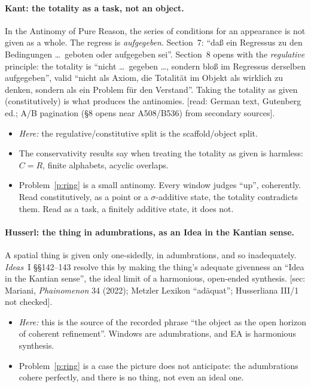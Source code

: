 \documentclass[11pt]{article}
\theoremstyle{definition}
\theoremstyle{remark}
\begin{document}
\paragraph{Kant: the totality as a task, not an object.}
In the Antinomy of Pure Reason, the series of conditions for an appearance is not
given as a whole. The regress is \emph{aufgegeben}. Section~7: ``daß ein
Regressus zu den Bedingungen \dots\ geboten oder aufgegeben sei''. Section~8 opens
with the \emph{regulative} principle: the totality is ``nicht \dots\ gegeben
\dots, sondern bloß im Regressus derselben aufgegeben'', valid ``nicht als Axiom,
die Totalität im Objekt als wirklich zu denken, sondern als ein Problem für den
Verstand''. Taking the totality as given (constitutively) is what produces the
antinomies. \textsf{[read: German text, Gutenberg ed.; A/B pagination (\S8 opens
near A508/B536) from secondary sources]}.
\begin{itemize}[nosep]
  \item \emph{Here:} the regulative/constitutive split is the scaffold/object
    split.
  \item The conservativity results say when treating the totality as given is
    harmless: $C=R$, finite alphabets, acyclic overlaps.
  \item Problem~\ref{p:ring} is a small antinomy. Every window judges ``up'',
    coherently. Read constitutively, as a point or a $\sigma$-additive state, the
    totality contradicts them. Read as a task, a finitely additive state, it does
    not.
\end{itemize}

\paragraph{Husserl: the thing in adumbrations, as an Idea in the Kantian sense.}
A spatial thing is given only one-sidedly, in adumbrations, and so inadequately.
\emph{Ideas}~I \S\S142--143 resolve this by making the thing's adequate givenness
an ``Idea in the Kantian sense'', the ideal limit of a harmonious, open-ended
synthesis. \textsf{[sec: Mariani, \emph{Phainomenon} 34 (2022); Metzler Lexikon
``ad\"aquat''; Husserliana III/1 not checked]}.
\begin{itemize}[nosep]
  \item \emph{Here:} this is the source of the recorded phrase ``the object as
    the open horizon of coherent refinement''. Windows are adumbrations, and EA
    is harmonious synthesis.
  \item Problem~\ref{p:ring} is a case the picture does not anticipate: the
    adumbrations cohere perfectly, and there is no thing, not even an ideal one.
\end{itemize}
\end{document}
